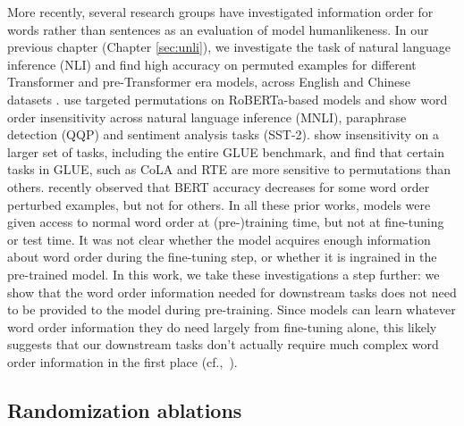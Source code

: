 \documentclass[letterpaper, 12pt]{report}
\begin{document}
More recently, several research groups have investigated information order for words rather than sentences as an evaluation of model humanlikeness. %
In our previous chapter (Chapter \autoref{sec:unli}), we investigate the task of natural language inference (NLI) and find high accuracy on permuted examples for different Transformer and pre-Transformer era models, across English and Chinese datasets \cite{hu-etal-2020-ocnli}.
\citet{gupta-etal-2021-bert} use targeted permutations on RoBERTa-based models and show word order insensitivity across natural language inference (MNLI), paraphrase detection (QQP) and sentiment analysis tasks (SST-2).
\citet{pham2020} show insensitivity on a larger set of tasks, including the entire GLUE benchmark, and find that certain tasks in GLUE, such as CoLA and RTE are more sensitive to permutations than others.
\cite{ettinger-2020-whatbertisnot} recently observed that BERT accuracy decreases for some word order perturbed examples, but not for others.
In all these prior works, models were given access to normal word order at (pre-)training time, but not at fine-tuning or test time. It was not clear whether the model acquires enough information about word order during the fine-tuning step, or whether it is ingrained in the pre-trained model.
In this work, we take these investigations a step further: we show that the word order information needed for downstream tasks does not need to be provided to the model during pre-training. Since models can learn whatever word order information they do need largely from fine-tuning alone, this likely suggests that our downstream tasks don't actually require much complex word order information in the first place (cf.,\ \citealt{glavas-vulic-2021-supervised}).

\subsection{Randomization ablations}
\end{document}
